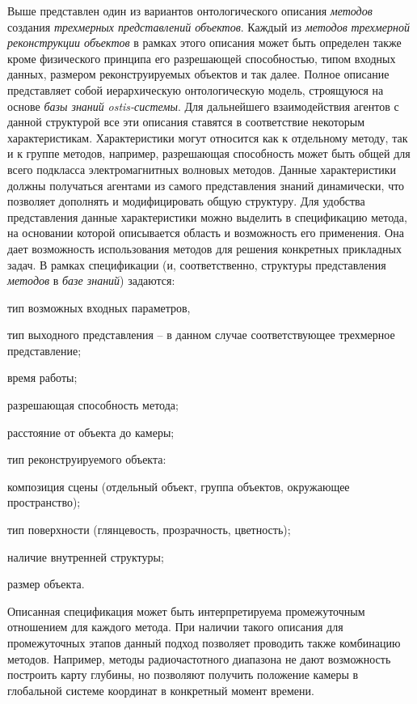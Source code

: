 Выше представлен один из вариантов онтологического описания \textit{методов} создания \textit{трехмерных представлений объектов}. Каждый из \textit{методов} \textit{трехмерной реконструкции объектов} в рамках этого описания может быть определен также кроме физического принципа его разрешающей способностью, типом входных данных, размером реконструируемых объектов и так далее. Полное описание представляет собой иерархическую онтологическую модель, строящуюся на основе \textit{базы знаний} \textit{ostis-системы}. Для дальнейшего взаимодействия агентов с данной структурой все эти описания ставятся в соответствие некоторым характеристикам. Характеристики могут относится как к отдельному методу, так и к группе методов, например, разрешающая способность может быть общей для всего подкласса электромагнитных волновых методов. Данные характеристики должны получаться агентами из самого представления знаний динамически, что позволяет дополнять и модифицировать общую структуру.
Для удобства представления данные характеристики можно выделить в спецификацию метода, на основании которой описывается область и возможность его применения. Она дает возможность использования методов для решения конкретных прикладных задач. В рамках спецификации (и, соответственно, структуры представления \textit{методов} в \textit{базе знаний}) задаются:
\begin{textitemize}
    \item тип возможных входных параметров,
    \item тип выходного представления -- в данном случае соответствующее трехмерное представление;
    \item время работы;
    \item разрешающая способность метода;
    \item расстояние от объекта до камеры;
    \item тип реконструируемого объекта:
    \item композиция сцены (отдельный объект, группа объектов, окружающее пространство);
    \item тип поверхности (глянцевость, прозрачность, цветность);
    \item наличие внутренней структуры;
    \item размер объекта.
\end{textitemize}

Описанная спецификация может быть интерпретируема промежуточным отношением для каждого метода. При наличии такого описания для промежуточных этапов данный подход позволяет проводить также комбинацию методов. Например, методы радиочастотного диапазона не дают возможность построить карту глубины, но позволяют получить положение камеры в глобальной системе координат в конкретный момент времени.

